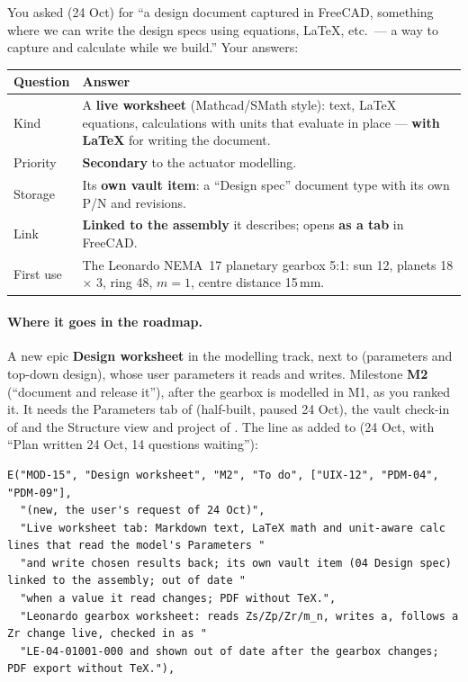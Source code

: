 You asked (24 Oct) for ``a design document captured in FreeCAD, something where we can write the design specs using
equations, LaTeX, etc.\ --- a way to capture and calculate while we build.'' Your answers:
\begin{center}
\small
\begin{tabularx}{\linewidth}{@{}lX@{}}
\toprule
Question & Answer\\
\midrule
Kind & A \textbf{live worksheet} (Mathcad/SMath style): text, LaTeX equations, calculations with units that evaluate in
  place --- \textbf{with LaTeX} for writing the document.\\
Priority & \textbf{Secondary} to the actuator modelling.\\
Storage & Its \textbf{own vault item}: a ``Design spec'' document type with its own P/N and revisions.\\
Link & \textbf{Linked to the assembly} it describes; opens \textbf{as a tab} in FreeCAD.\\
First use & The Leonardo NEMA~17 planetary gearbox 5:1: sun 12, planets 18 $\times$ 3, ring 48, $m = 1$,
  centre distance 15\,mm.\\
\bottomrule
\end{tabularx}
\end{center}

\paragraph{Where it goes in the roadmap.} A new epic \textbf{ Design worksheet} in the modelling track,
next to  (parameters and top-down design), whose user parameters it reads and writes. Milestone
\textbf{M2} (``document and release it''), after the gearbox is modelled in M1, as you ranked it. It needs the
Parameters tab of  (half-built, paused 24 Oct), the vault check-in of  and the Structure view and project of
. The line as added to  (24 Oct, with ``Plan written 24 Oct, 14 questions waiting''):
\begin{lstlisting}
E("MOD-15", "Design worksheet", "M2", "To do", ["UIX-12", "PDM-04", "PDM-09"],
  "(new, the user's request of 24 Oct)",
  "Live worksheet tab: Markdown text, LaTeX math and unit-aware calc lines that read the model's Parameters "
  "and write chosen results back; its own vault item (04 Design spec) linked to the assembly; out of date "
  "when a value it read changes; PDF without TeX.",
  "Leonardo gearbox worksheet: reads Zs/Zp/Zr/m_n, writes a, follows a Zr change live, checked in as "
  "LE-04-01001-000 and shown out of date after the gearbox changes; PDF export without TeX."),
\end{lstlisting}

